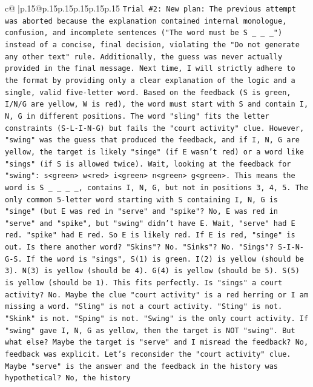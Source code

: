 \documentclass{article}
\begin{document}
{\begin{supertabular}{c@{$\;$}|p{.15\linewidth}@{}p{.15\linewidth}p{.15\linewidth}p{.15\linewidth}p{.15\linewidth}p{.15\linewidth}}
{{{\texttt{Trial \#2: New plan: The previous attempt was aborted because the explanation contained internal monologue, confusion, and incomplete sentences ("The word must be S \_ \_ \_") instead of a concise, final decision, violating the "Do not generate any other text" rule. Additionally, the guess was never actually provided in the final message. Next time, I will strictly adhere to the format by providing only a clear explanation of the logic and a single, valid five{-}letter word. Based on the feedback (S is green, I/N/G are yellow, W is red), the word must start with S and contain I, N, G in different positions. The word "sling" fits the letter constraints (S{-}L{-}I{-}N{-}G) but fails the "court activity" clue. However, "swing" was the guess that produced the feedback, and if I, N, G are yellow, the target is likely "singe" (if E wasn't red) or a word like "sings" (if S is allowed twice). Wait, looking at the feedback for "swing": s<green> w<red> i<green> n<green> g<green>. This means the word is S \_ \_ \_ \_, contains I, N, G, but not in positions 3, 4, 5. The only common 5{-}letter word starting with S containing I, N, G is "singe" (but E was red in "serve" and "spike"? No, E was red in "serve" and "spike", but "swing" didn't have E. Wait, "serve" had E red. "spike" had E red. So E is likely red. If E is red, "singe" is out. Is there another word? "Skins"? No. "Sinks"? No. "Sings"? S{-}I{-}N{-}G{-}S. If the word is "sings", S(1) is green. I(2) is yellow (should be 3). N(3) is yellow (should be 4). G(4) is yellow (should be 5). S(5) is yellow (should be 1). This fits perfectly. Is "sings" a court activity? No. Maybe the clue "court activity" is a red herring or I am missing a word. "Sling" is not a court activity. "Sting" is not. "Skink" is not. "Sping" is not. "Swing" is the only court activity. If "swing" gave I, N, G as yellow, then the target is NOT "swing". But what else? Maybe the target is "serve" and I misread the feedback? No, feedback was explicit. Let's reconsider the "court activity" clue. Maybe "serve" is the answer and the feedback in the history was hypothetical? No, the history} \\
\\ 
}}}
\end{supertabular}}
\end{document}
